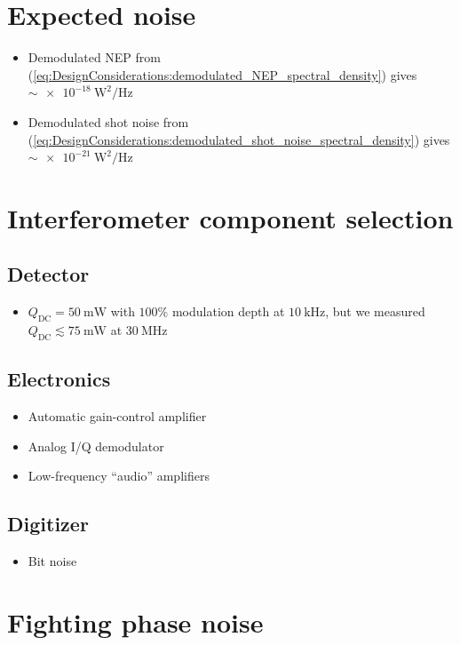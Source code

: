 \section{Expected noise}

\begin{itemize}
  \item Demodulated NEP from
    (\ref{eq:DesignConsiderations:demodulated_NEP_spectral_density}) gives
    $\sim \SI{e-18}{\watt\squared\per\hertz}$
  \item Demodulated shot noise from
    (\ref{eq:DesignConsiderations:demodulated_shot_noise_spectral_density})
    gives $\sim \SI{e-21}{\watt\squared\per\hertz}$
\end{itemize}


\section{Interferometer component selection}
\subsection{Detector}
\begin{itemize}
  \item $Q_{\text{DC}} = \SI{50}{\milli\watt}$ with $100\%$ modulation depth
    at $\SI{10}{\kilo\hertz}$, but we measured
    $Q_{\text{DC}} \lesssim \SI{75}{\milli\watt}$ at $\SI{30}{\mega\hertz}$
\end{itemize}

\subsection{Electronics}
\begin{itemize}
  \item Automatic gain-control amplifier
  \item Analog I/Q demodulator
  \item Low-frequency ``audio'' amplifiers
\end{itemize}
\subsection{Digitizer}
\begin{itemize}
  \item Bit noise
\end{itemize}




\section{Fighting phase noise}
